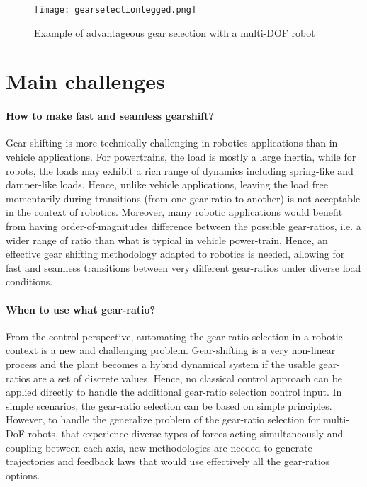 \begin{figure}[H]
	\centering
		\texttt{[image: gearselectionlegged.png]}
	\caption{Example of advantageous gear selection with a multi-DOF robot}
	\label{fig:gearselectionlegged}
\end{figure}


\section{Main challenges}
\label{sec:MainChallenges}

\paragraph{How to make fast and seamless gearshift?}
Gear shifting is more technically challenging in robotics applications than in vehicle applications. For powertrains, the load is mostly a large inertia, while for robots, the loads may exhibit a rich range of dynamics including spring-like and damper-like loads. Hence, unlike vehicle applications, leaving the load free momentarily during transitions (from one gear-ratio to another) is not acceptable in the context of robotics. Moreover, many robotic applications would benefit from having order-of-magnitudes difference between the possible gear-ratios, i.e. a wider range of ratio than what is typical in vehicle power-train. Hence, an effective gear shifting methodology adapted to robotics is needed, allowing for fast and seamless transitions between very different gear-ratios under diverse load conditions.

\paragraph{When to use what gear-ratio?}
From the control perspective, automating the gear-ratio selection in a robotic context is a new and challenging problem. Gear-shifting is a very non-linear process and the plant becomes a hybrid dynamical system if the usable gear-ratios are a set of discrete values. Hence, no classical control approach can be applied directly to handle the additional gear-ratio selection control input. In simple scenarios, the gear-ratio selection can be based on simple principles. However, to handle the generalize problem of the gear-ratio selection for multi-DoF robots, that experience diverse types of forces acting simultaneously and coupling between each axis, new methodologies are needed to generate trajectories and feedback laws that would use effectively all the gear-ratios options.



